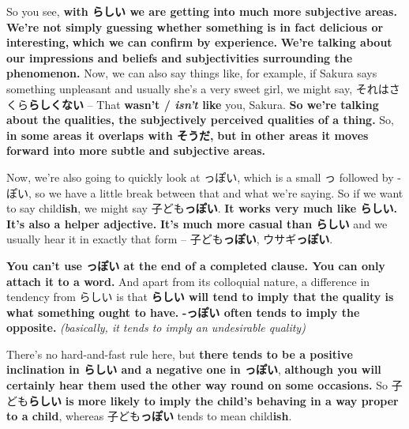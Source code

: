{}

So you see, {\bf with らしい we are getting into much more subjective areas.} {\bf We're not simply guessing whether something is in fact delicious or interesting,} {\bf which we can confirm by experience.} {\bf We're talking about our impressions and beliefs and subjectivities surrounding the phenomenon.} Now, we can also say things like, for example, if Sakura says something unpleasant and usually she's a very sweet girl, we might say, それはさくら{\bf らしくない} -- That {\bf wasn't / {\em isn't} like} you, Sakura. {\bf So we're talking about the qualities, the subjectively perceived qualities of a thing.} So, {\bf in some areas it overlaps with そうだ,} {\bf but in other areas it moves forward into more subtle and subjective areas.}

\stopsectionlevel

\stopsectionlevel

\startsectionlevel[title={っぽい},reference={っぽい}]

Now, we're also going to quickly look at っぽい, which is a small っ followed by -ぽい, so we have a little break between that and what we're saying. So if we want to say child{\bf ish}, we might say 子ども{\bf っぽい}. {\bf It works very much like らしい. It's also a helper adjective.} {\bf It's much more casual than らしい} and we usually hear it in exactly that form -- 子ども{\bf っぽい}, ウサギ{\bf っぽい}.

\thinrule

{\bf You can't use っぽい at the end of a completed clause. You can only attach it to a word.} And apart from its colloquial nature, a difference in tendency from らしい is that {\bf らしい will tend to imply that the quality is what something ought to have.} {\bf -っぽい often tends to imply the opposite.} {\em (basically, it tends to imply an undesirable quality)}

\thinrule

There's no hard-and-fast rule here, but {\bf there tends to be a positive inclination in らしい and a negative one in っぽい}, {\bf although you will certainly hear them used the other way round on some occasions.} So 子ども{\bf らしい} {\bf is more likely to imply the child's behaving in a way proper to a child}, whereas 子ども{\bf っぽい} tends to mean child{\bf ish}.

